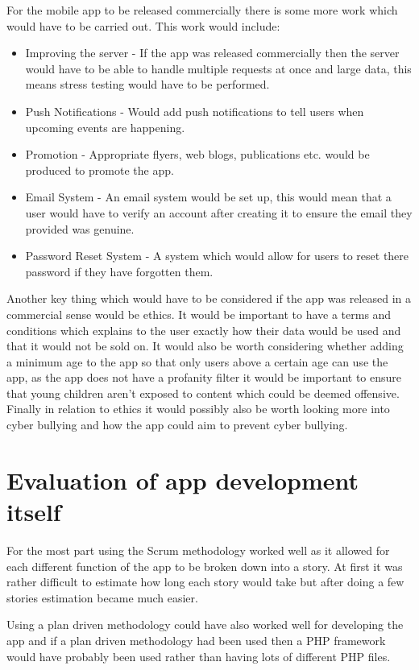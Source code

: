 For the mobile app to be released commercially there is some more work which would have to be carried out. This work would include:
\begin{itemize}
\item Improving the server - If the app was released commercially then the server would have to be able to handle multiple requests at once and large data, this means stress testing would have to be performed.
\item Push Notifications - Would add push notifications to tell users when upcoming events are happening.
\item Promotion - Appropriate flyers, web blogs, publications etc. would be produced to promote the app.
\item Email System - An email system would be set up, this would mean that a user would have to verify an account after creating it to ensure the email they provided was genuine.
\item Password Reset System - A system which would allow for users to reset there password if they have forgotten them.
\end{itemize} 
Another key thing which would have to be considered if the app was released in a commercial sense would be ethics. It would be important to have a terms and conditions which explains to the user exactly how their data would be used and that it would not be sold on. It would also be worth considering whether adding a minimum age to the app so that only users above a certain age can use the app, as the app does not have a profanity filter it would be important to ensure that young children aren't exposed to content which could be deemed offensive. Finally in relation to ethics it would possibly also be worth looking more into cyber bullying and how the app could aim to prevent cyber bullying.

\section{Evaluation of app development itself}
For the most part using the Scrum methodology worked well as it allowed for each different function of the app to be broken down into a story. At first it was rather difficult to estimate how long each story would take but after doing a few stories estimation became much easier.

Using a plan driven methodology could have also worked well for developing the app and if a plan driven methodology had been used then a PHP framework would have probably been used rather than having lots of different PHP files. 



